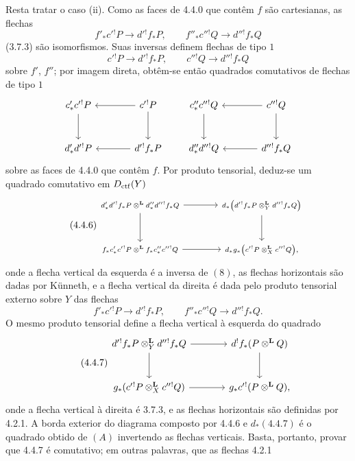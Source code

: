 \begin{prooftext}[Demonstração]
Resta tratar o caso (ii). Como as faces de 4.4.0 que contêm $f$ são cartesianas, as flechas
\[
f'_*c'{}^!P\longrightarrow d'{}^!f_*P,\qquad
f''_*c''{}^!Q\longrightarrow d''{}^!f_*Q
\]
(3.7.3) são isomorfismos. Suas inversas definem flechas de tipo $1$
\[
c'{}^!P\longrightarrow d'{}^!f_*P,\qquad
c''{}^!Q\longrightarrow d''{}^!f_*Q
\]
sobre $f'$, $f''$; por imagem direta, obtêm-se então quadrados comutativos de flechas de tipo $1$
\[
\begin{tikzcd}[column sep=large,row sep=large]
c'_*c'{}^!P \arrow[d] & c'{}^!P\arrow[l]\arrow[d]\\
d'_*d'{}^!P & d'{}^!f_*P\arrow[l]
\end{tikzcd}
\qquad
\begin{tikzcd}[column sep=large,row sep=large]
c''_*c''{}^!Q \arrow[d] & c''{}^!Q\arrow[l]\arrow[d]\\
d''_*d''{}^!Q & d''{}^!f_*Q\arrow[l]
\end{tikzcd}
\]
sobre as faces de 4.4.0 que contêm $f$. Por produto tensorial, deduz-se um quadrado comutativo em $D_{\mathrm{ctf}}(Y)$
\begin{equation}
\tag{4.4.6}
\begin{tikzcd}[column sep=large,row sep=large,cells={nodes={font=\scriptsize}}]
d'_*d'{}^!f_*P\otimes^{\mathbf L}d''_*d''{}^!f_*Q
 \arrow[r]\arrow[d] &
d_*\bigl(d'{}^!f_*P\otimes_Y^{\mathbf L}d''{}^!f_*Q\bigr)\arrow[d]\\
f_*c'_*c'{}^!P\otimes^{\mathbf L}f_*c''_*c''{}^!Q
 \arrow[r] &
d_*g_*\bigl(c'{}^!P\otimes_X^{\mathbf L}c''{}^!Q\bigr),
\end{tikzcd}
\end{equation}
onde a flecha vertical da esquerda é a inversa de $(8)$, as flechas horizontais são dadas por Künneth, e a flecha vertical da direita é dada pelo produto tensorial externo sobre $Y$ das flechas
\[
f'_*c'{}^!P\longrightarrow d'{}^!f_*P,\qquad
f''_*c''{}^!Q\longrightarrow d''{}^!f_*Q.
\]
O mesmo produto tensorial define a flecha vertical à esquerda do quadrado
\begin{equation}
\tag{4.4.7}
\begin{tikzcd}[column sep=large,row sep=large]
d'{}^!f_*P\otimes_Y^{\mathbf L}d''{}^!f_*Q
 \arrow[r]\arrow[d] &
d^!f_*(P\otimes^{\mathbf L}Q)\arrow[d]\\
g_*(c'{}^!P\otimes_X^{\mathbf L}c''{}^!Q)
 \arrow[r] &
g_*c'{}^!(P\otimes^{\mathbf L}Q),
\end{tikzcd}
\end{equation}
onde a flecha vertical à direita é 3.7.3, e as flechas horizontais são definidas por 4.2.1. A borda exterior do diagrama composto por 4.4.6 e $d_*(4.4.7)$ é o quadrado obtido de $(A)$ invertendo as flechas verticais. Basta, portanto, provar que 4.4.7 é comutativo; em outras palavras, que as flechas 4.2.1

\end{prooftext}
